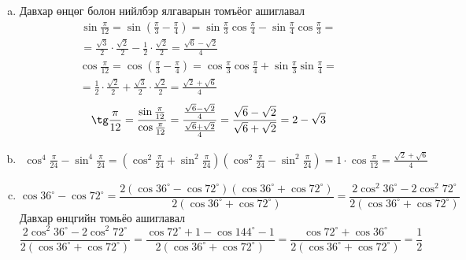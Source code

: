\documentclass[10pt,a4paper,oneside]{book}
\begin{document}
\TheSolution
\begin{enumerate}[(a)]
\item Давхар өнцөг болон нийлбэр ялгаварын томъёог ашиглавал
\begin{equation*}
\begin{split}
\sin\frac{\pi}{12} = \sin\left(\frac{\pi}{3}-\frac{\pi}{4}\right)=\sin\frac{\pi}{3}\cos\frac{\pi}{4}-\sin\frac{\pi}{4}\cos\frac{\pi}{3}=\\
=\frac{\sqrt{3}}{2}\cdot\frac{\sqrt{2}}{2}-\frac{1}{2}\cdot\frac{\sqrt{2}}{2}=\frac{\sqrt{6}-\sqrt{2}}{4}
\end{split}
\end{equation*}
\begin{equation*}
\begin{split}
\cos\frac{\pi}{12} = \cos\left(\frac{\pi}{3}-\frac{\pi}{4}\right) = \cos\frac{\pi}{3}\cos\frac{\pi}{4}+\sin\frac{\pi}{3}\sin\frac{\pi}{4}=\\
=\frac{1}{2}\cdot\frac{\sqrt{2}}{2}+\frac{\sqrt{3}}{2}\cdot\frac{\sqrt{2}}{2}=\frac{\sqrt{2}+\sqrt{6}}{4}
\end{split}
\end{equation*}
\begin{equation*}
\begin{split}
\tg\frac{\pi}{12}=\frac{\sin\frac{\pi}{12}}{\cos\frac{\pi}{12}}=\frac{\frac{\sqrt{6}-\sqrt{2}}{4}}{\frac{\sqrt{6}+\sqrt{2}}{4}}=\frac{\sqrt{6}-\sqrt{2}}{\sqrt{6}+\sqrt{2}}=2-\sqrt{3}
\end{split}
\end{equation*}
\item
\begin{equation*}
\begin{split}
\cos^4\frac{\pi}{24}-\sin^4\frac{\pi}{24}=\left(\cos^2\frac{\pi}{24}+\sin^2\frac{\pi}{24}\right)\left(\cos^2\frac{\pi}{24}-\sin^2\frac{\pi}{24}\right) = 1\cdot\cos\frac{\pi}{12} = \frac{\sqrt{2}+\sqrt{6}}{4}
\end{split}
\end{equation*}
\item
\begin{equation*}
\cos 36^\circ - \cos 72^\circ = \frac{2\left(\cos 36^\circ - \cos 72^\circ\right)\left(\cos 36^\circ + \cos 72^\circ\right)}{2\left(\cos 36^\circ + \cos 72^\circ\right)}=\frac{2\cos^2 36^\circ - 2\cos^2 72^\circ}{2\left(\cos 36^\circ + \cos 72^\circ\right)}
\end{equation*}
Давхар өнцгийн томьёо ашиглавал
\begin{equation*}
\frac{2\cos^2 36^\circ - 2\cos^2 72^\circ}{2\left(\cos 36^\circ + \cos 72^\circ\right)} = \frac{\cos 72^\circ + 1 - \cos 144^\circ -1}{2\left(\cos 36^\circ + \cos 72^\circ\right)} = \frac{\cos 72^\circ + \cos 36^\circ}{2\left(\cos 36^\circ + \cos 72^\circ\right)} = \frac{1}{2}

\end{equation*}
\end{enumerate}
\end{document}
